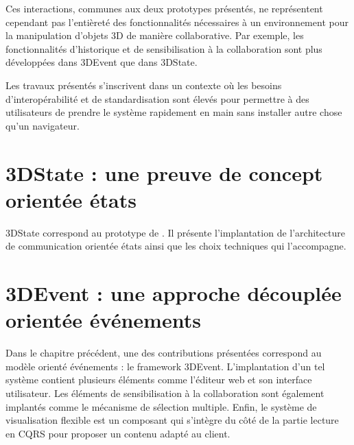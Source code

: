 Ces interactions, communes aux deux prototypes présentés, ne 
représentent cependant pas l'entièreté des fonctionnalités nécessaires à un 
environnement pour la manipulation d'objets 3D de manière 
collaborative. Par exemple, les fonctionnalités d'historique et de sensibilisation à 
la collaboration sont plus développées dans 3DEvent que dans 3DState.


Les travaux présentés s'inscrivent dans un contexte où les besoins 
d'interopérabilité et de standardisation sont élevés pour permettre à des 
utilisateurs de prendre le système rapidement en main sans installer autre chose 
qu'un navigateur.
\section{3DState : une preuve de concept orientée états}
\label{sec:3DState}
3DState correspond au prototype de 
\cite{Desprat2015a,Desprat2015b}. Il présente l'implantation de l'architecture de 
communication orientée états ainsi que les choix techniques qui l'accompagne.







\section{3DEvent : une approche découplée orientée événements}
\label{sec:3DEvent}
Dans le chapitre précédent, une des contributions présentées correspond au 
modèle orienté événements : le \gls{framework} 3DEvent. 
L'implantation d'un tel système contient plusieurs éléments comme l'éditeur 
web et son interface utilisateur. Les éléments de sensibilisation à la collaboration 
sont également implantés comme le mécanisme de sélection multiple. Enfin, le 
système de visualisation flexible est un composant qui s'intègre du côté de la 
partie lecture en \gls{CQRS} pour proposer un contenu adapté au client. 



